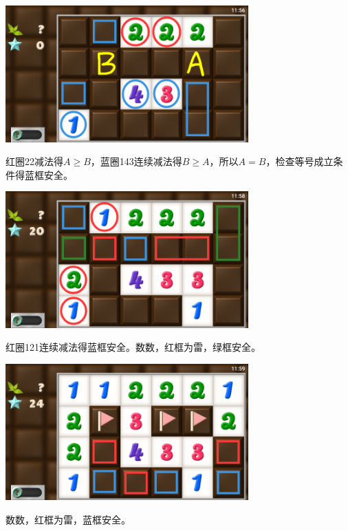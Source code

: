 \subsection{} %
\begin{center}
    \includegraphics[width=0.7\textwidth]{puzzle/170-1.png}
\end{center}
红圈22减法得$A\ge B$，蓝圈143连续减法得$B\ge A$，所以$A=B$，检查等号成立条件得蓝框安全。
\begin{center}
    \includegraphics[width=0.7\textwidth]{puzzle/170-2.png}
\end{center}
红圈121连续减法得蓝框安全。数数，红框为雷，绿框安全。
\begin{center}
    \includegraphics[width=0.7\textwidth]{puzzle/170-3.png}
\end{center}
数数，红框为雷，蓝框安全。

